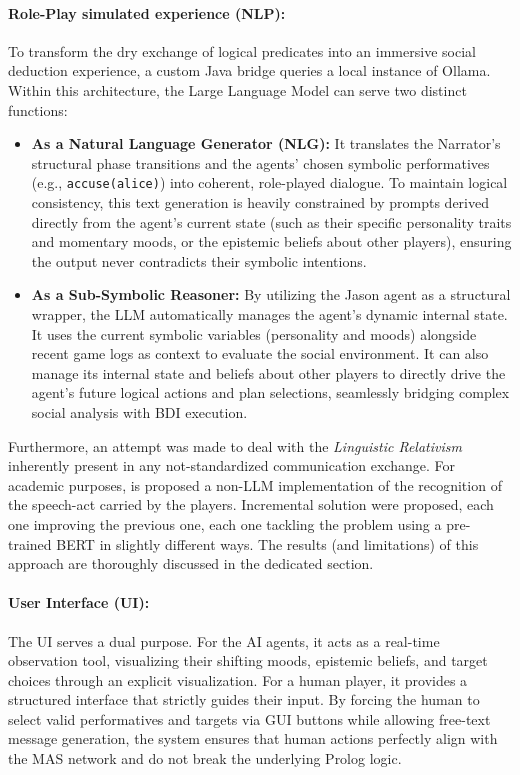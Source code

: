\documentclass[12pt]{article}
\begin{document}
\paragraph{Role-Play simulated experience (NLP):}
To transform the dry exchange of logical predicates into an immersive social deduction experience, a custom Java bridge queries a local instance of Ollama. Within this architecture, the Large Language Model can serve two distinct functions:
\begin{itemize}
    \item \textbf{As a Natural Language Generator (NLG):} It translates the Narrator's structural phase transitions and the agents' chosen symbolic performatives (e.g., \texttt{accuse(alice)}) into coherent, role-played dialogue. 
    To maintain logical consistency, this text generation is heavily constrained by prompts derived directly from the agent's current state (such as their specific personality traits and momentary moods, or the epistemic beliefs about other players), ensuring the output never contradicts their symbolic intentions.
    
    \item \textbf{As a Sub-Symbolic Reasoner:} By utilizing the Jason agent as a structural wrapper, the LLM automatically manages the agent's dynamic internal state. It uses the current symbolic variables (personality and moods) alongside recent game logs as context to evaluate the social environment. 
    It can also manage its internal state and beliefs about other players to directly drive the agent's future logical actions and plan selections, seamlessly bridging complex social analysis with BDI execution.
\end{itemize}

Furthermore, an attempt was made to deal with the \emph{Linguistic  Relativism} inherently present in any not-standardized communication exchange. For academic purposes, is proposed a non-LLM implementation of the recognition of the speech-act carried by the  players. Incremental solution were proposed, each one improving the previous one, each one tackling the problem using a pre-trained BERT in slightly different ways. The results (and limitations) of this approach are thoroughly discussed in the dedicated section.

\paragraph{User Interface (UI):}
The UI serves a dual purpose. For the AI agents, it acts as a real-time observation tool, visualizing their shifting moods, epistemic beliefs, and target choices through an explicit visualization. 
For a human player, it provides a structured interface that strictly guides their input. By forcing the human to select valid performatives and targets via GUI buttons while allowing free-text message generation, the system ensures that human actions perfectly align with the MAS network and do not break the underlying Prolog logic.
\end{document}
